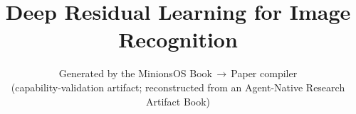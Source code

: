 \documentclass[11pt]{article}
\title{Deep Residual Learning for Image Recognition}
\author{Generated by the MinionsOS Book\,$\rightarrow$\,Paper compiler\\
\small (capability-validation artifact; reconstructed from an Agent-Native Research Artifact Book)}
\date{}
\begin{document}
\maketitle

\begin{abstract}

\end{abstract}









\end{document}
